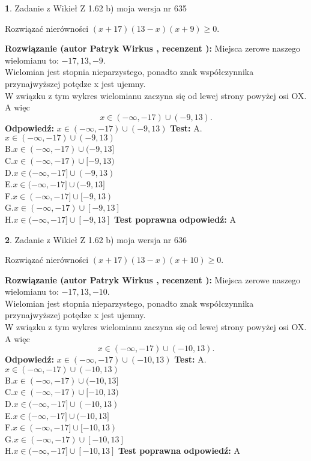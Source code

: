 \documentclass[12pt, a4paper]{article}
\theoremstyle{definition} %
\newtheorem{zad}{}
\newcommand{\zadStart}[1]{\begin{zad}#1\newline}
\newcommand{\zadStop}{\end{zad}}
\newcommand{\rozwStart}[2]{\noindent \textbf{Rozwiązanie (autor #1 , recenzent #2): }\newline}
\newcommand{\rozwStop}{\newline}
\newcommand{\odpStart}{\noindent \textbf{Odpowiedź:}\newline}
\newcommand{\odpStop}{\newline}
\newcommand{\testStart}{\noindent \textbf{Test:}\newline}
\newcommand{\testStop}{\newline}
\newcommand{\kluczStart}{\noindent \textbf{Test poprawna odpowiedź:}\newline}
\newcommand{\kluczStop}{\newline}
\begin{document}
\zadStart{Zadanie z Wikieł Z 1.62 b) moja wersja nr 635}

Rozwiązać nierówności $(x+17)(13-x)(x+9)\ge0$.
\zadStop
\rozwStart{Patryk Wirkus}{}
Miejsca zerowe naszego wielomianu to: $-17, 13, -9$.\\
Wielomian jest stopnia nieparzystego, ponadto znak współczynnika przy\linebreak najwyższej potędze x jest ujemny.\\ W związku z tym wykres wielomianu zaczyna się od lewej strony powyżej osi OX. A więc $$x \in (-\infty,-17) \cup (-9,13).$$
\rozwStop
\odpStart
$x \in (-\infty,-17) \cup (-9,13)$
\odpStop
\testStart
A.$x \in (-\infty,-17) \cup (-9,13)$\\
B.$x \in (-\infty,-17) \cup (-9,13]$\\
C.$x \in (-\infty,-17) \cup [-9,13)$\\
D.$x \in (-\infty,-17] \cup (-9,13)$\\
E.$x \in (-\infty,-17] \cup (-9,13]$\\
F.$x \in (-\infty,-17] \cup [-9,13)$\\
G.$x \in (-\infty,-17) \cup [-9,13]$\\
H.$x \in (-\infty,-17] \cup [-9,13]$
\testStop
\kluczStart
A
\kluczStop



\zadStart{Zadanie z Wikieł Z 1.62 b) moja wersja nr 636}

Rozwiązać nierówności $(x+17)(13-x)(x+10)\ge0$.
\zadStop
\rozwStart{Patryk Wirkus}{}
Miejsca zerowe naszego wielomianu to: $-17, 13, -10$.\\
Wielomian jest stopnia nieparzystego, ponadto znak współczynnika przy\linebreak najwyższej potędze x jest ujemny.\\ W związku z tym wykres wielomianu zaczyna się od lewej strony powyżej osi OX. A więc $$x \in (-\infty,-17) \cup (-10,13).$$
\rozwStop
\odpStart
$x \in (-\infty,-17) \cup (-10,13)$
\odpStop
\testStart
A.$x \in (-\infty,-17) \cup (-10,13)$\\
B.$x \in (-\infty,-17) \cup (-10,13]$\\
C.$x \in (-\infty,-17) \cup [-10,13)$\\
D.$x \in (-\infty,-17] \cup (-10,13)$\\
E.$x \in (-\infty,-17] \cup (-10,13]$\\
F.$x \in (-\infty,-17] \cup [-10,13)$\\
G.$x \in (-\infty,-17) \cup [-10,13]$\\
H.$x \in (-\infty,-17] \cup [-10,13]$
\testStop
\kluczStart
A
\kluczStop
\end{document}
